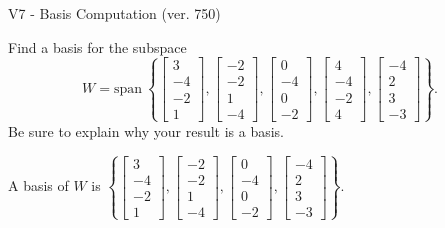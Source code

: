 \begin{exercise}
  \begin{exerciseTitle}V7 - Basis Computation (ver. 750)\end{exerciseTitle}
  \begin{exerciseStatement}
    Find a basis for the subspace 
\[W=\mathrm{span}\ \left\{\left[\begin{array}{r}
3 \\
-4 \\
-2 \\
1
\end{array}\right] , \left[\begin{array}{r}
-2 \\
-2 \\
1 \\
-4
\end{array}\right] , \left[\begin{array}{r}
0 \\
-4 \\
0 \\
-2
\end{array}\right] , \left[\begin{array}{r}
4 \\
-4 \\
-2 \\
4
\end{array}\right] , \left[\begin{array}{r}
-4 \\
2 \\
3 \\
-3
\end{array}\right]\right\}.\]
 Be sure to explain why your result is a basis.


  \end{exerciseStatement}
  \begin{exerciseAnswer}
   A basis of \(W\) is  \(\left\{\left[\begin{array}{r}
3 \\
-4 \\
-2 \\
1
\end{array}\right] , \left[\begin{array}{r}
-2 \\
-2 \\
1 \\
-4
\end{array}\right] , \left[\begin{array}{r}
0 \\
-4 \\
0 \\
-2
\end{array}\right] , \left[\begin{array}{r}
-4 \\
2 \\
3 \\
-3
\end{array}\right]\right\}\).
  


  \end{exerciseAnswer}
\end{exercise}